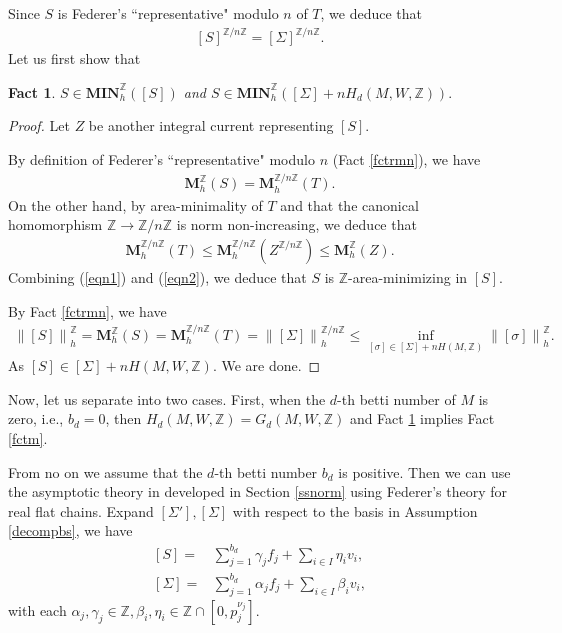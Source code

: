 \documentclass[11pt,a4paper]{amsart}
\numberwithin{equation}{section}
\newcommand{\ai}{\alpha}
\newcommand{\mn}{\mathbf{MIN}}
\newcommand{\be}{\beta}
\newcommand{\ga}{\gamma}
\newcommand{\si}{\sigma}
\newcommand{\Si}{\Sigma}
\newcommand{\ms}{\mathbf{M}}
\newcommand{\no}[1]{\left\lVert#1\right\rVert}
\newcommand{\Z}{\mathbb{Z}}
\theoremstyle{plain}
\newtheorem{fact}{Fact}[subsection]
\theoremstyle{definition}
\numberwithin{equation}{subsection}
\begin{document}
Since $S$ is Federer's ``representative" modulo $n$ of $T$, we deduce that 
\begin{align}\label{eqsip}
	[S]^{\Z/n\Z}=[\Si]^{\Z/n\Z}.
\end{align}	
Let us first show that
\begin{fact}\label{fctsm}
	$S\in\mn_h^\Z([S])$ and $S\in \mn_h^{\Z}([\Si]+nH_d(M,W,\Z)).$
\end{fact}
\begin{proof}Let $Z$ be another integral current representing $[S].$ 	
	
	 By definition of Federer's ``representative" modulo $n$ (Fact \ref{fctrmn}), we have
	\begin{align}\label{eqn1}
		\ms_h^{\Z}(S)=\ms_h^{\Z/n\Z}(T).
	\end{align}On the other hand, by area-minimality of $T$ and that the canonical homomorphism $\Z\to \Z/n\Z$ is norm non-increasing, we deduce that
	\begin{align}\label{eqn2}
		\ms_h^{\Z/n\Z}(T)\le\ms_h^{\Z/n\Z}(Z^{\Z/n\Z})\le \ms_h^{\Z}(Z). 
	\end{align}
	Combining (\ref{eqn1}) and (\ref{eqn2}), we deduce that $S$ is $\Z$-area-minimizing in $[S].$ 
	
	By Fact \ref{fctrmn}, we have
	\begin{align}\label{eqssp}
		\no{[S]}_h^{\Z}=		\ms_h^{\Z}(S)=\ms_h^{\Z/n\Z}(T)=\no{[\Si]}_h^{\Z/n\Z}\le \inf_{[\sigma]\in [\Si]+nH(M,\Z)}\no{[\si]}_h^{\Z}.
	\end{align}
	As $[S]\in [\Si]+nH(M,W,\Z)$. We are done.
\end{proof}
Now, let us separate into two cases. First, when the $d$-th betti number of $M$ is zero, i.e., $b_d=0$, then $H_d(M,W,\Z)=G_d(M,W,\Z)$ and Fact \ref{fctsm} implies Fact \ref{fctm}.

From no on we assume that the $d$-th betti number $b_d$ is positive. Then we can use the asymptotic theory in developed in Section \ref{ssnorm} using Federer's theory for real flat chains.	Expand $[\Si'],[\Si]$ with respect to the basis in Assumption \ref{decompbs}, we have
\begin{align}\label{eqsp}
	[S]=&\sum_{j=1}^{b_d}\ga_jf_j+\sum_{i\in I}\eta_iv_i,\\
\label{eqsi}
	[\Si]=&\sum_{j=1}^{b_d}\ai_jf_j+\sum_{i\in I}\be_iv_i,
\end{align}
with each $\ai_j,\ga_j\in \Z,\be_i,\eta_i\in\Z\cap[0,p_j^{\nu_j}].$ 
\end{document}
